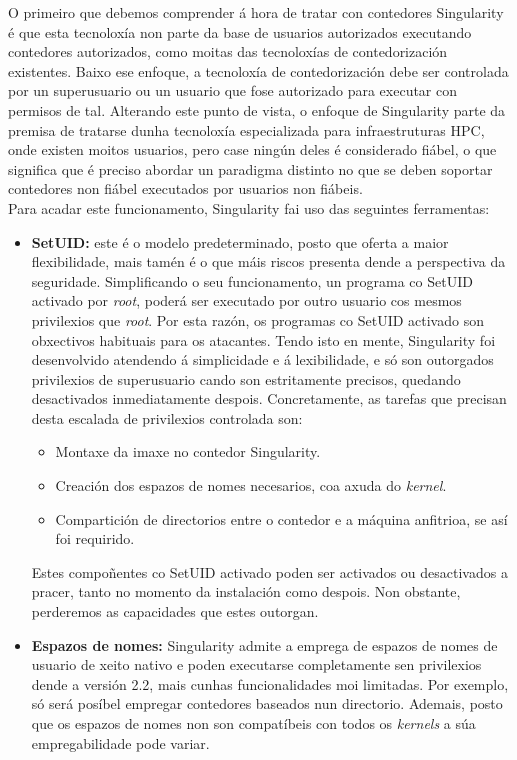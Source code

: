 O primeiro que debemos comprender á hora de tratar con contedores Singularity é que esta tecnoloxía non parte da base de usuarios autorizados executando contedores autorizados, como moitas das tecnoloxías de contedorización existentes. Baixo ese enfoque, a tecnoloxía de contedorización debe ser controlada por un superusuario ou un usuario que fose autorizado para executar con permisos de tal. Alterando este punto de vista, o enfoque de Singularity parte da premisa de tratarse dunha tecnoloxía especializada para infraestruturas \gls{HPC}, onde existen moitos usuarios, pero case ningún deles é considerado fiábel, o que significa que é preciso abordar un paradigma distinto no que se deben soportar contedores non fiábel executados por usuarios non fiábeis. \cite{SingularitySecurity}\\

Para acadar este funcionamento, Singularity fai uso das seguintes ferramentas:

\begin{itemize}
    \item \textbf{SetUID:} este é o modelo predeterminado, posto que oferta a maior flexibilidade, mais tamén é o que máis riscos presenta dende a perspectiva da seguridade. Simplificando o seu funcionamento, un programa co SetUID activado por \textit{root}, poderá ser executado por outro usuario cos mesmos privilexios que \textit{root}. Por esta razón, os programas co SetUID activado son obxectivos habituais para os atacantes. Tendo isto en mente, Singularity foi desenvolvido atendendo á simplicidade e á lexibilidade, e só son outorgados privilexios de superusuario cando son estritamente precisos, quedando desactivados inmediatamente despois. Concretamente, as tarefas que precisan desta escalada de privilexios controlada son:
    \begin{itemize}
        \item Montaxe da imaxe no contedor Singularity.
        \item Creación dos espazos de nomes necesarios, coa axuda do \textit{kernel}.
        \item Compartición de directorios entre o contedor e a máquina anfitrioa, se así foi requirido.
    \end{itemize}
    Estes compoñentes co SetUID activado poden ser activados ou desactivados a pracer, tanto no momento da instalación como despois. Non obstante, perderemos as capacidades que estes outorgan.
    \item \textbf{Espazos de nomes:} Singularity admite a emprega de espazos de nomes de usuario de xeito nativo e poden executarse completamente sen privilexios dende a versión 2.2, mais cunhas funcionalidades moi limitadas. Por exemplo, só será posíbel empregar contedores baseados nun directorio. Ademais, posto que os espazos de nomes non son compatíbeis con todos os \textit{kernels} a súa empregabilidade pode variar.
\end{itemize}

